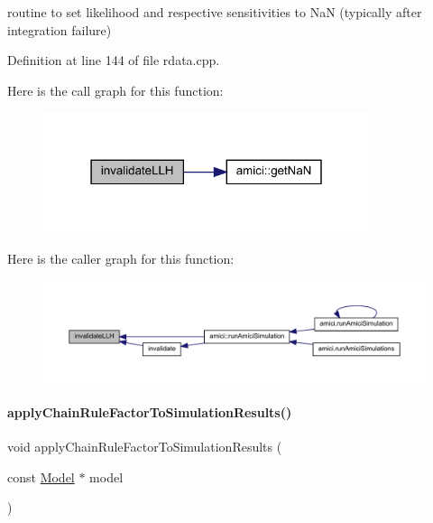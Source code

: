 routine to set likelihood and respective sensitivities to NaN (typically after integration failure)

Definition at line 144 of file rdata.\+cpp.

Here is the call graph for this function\+:
\nopagebreak
\begin{figure}[H]
\begin{center}
\leavevmode
\includegraphics[width=271pt]{classamici_1_1_return_data_a03e88745280c032d3b59fd7235665e17_cgraph}
\end{center}
\end{figure}
Here is the caller graph for this function\+:
\nopagebreak
\begin{figure}[H]
\begin{center}
\leavevmode
\includegraphics[width=350pt]{classamici_1_1_return_data_a03e88745280c032d3b59fd7235665e17_icgraph}
\end{center}
\end{figure}
\mbox{\label{classamici_1_1_return_data_adce202dc864a1e65d8453f597de271f5}} 
\paragraph{\texorpdfstring{apply\+Chain\+Rule\+Factor\+To\+Simulation\+Results()}{applyChainRuleFactorToSimulationResults()}}
{\footnotesize\ttfamily void apply\+Chain\+Rule\+Factor\+To\+Simulation\+Results (\begin{DoxyParamCaption}\item[{const \mbox{\hyperlink{classamici_1_1_model}{Model}} $\ast$}]{model }\end{DoxyParamCaption})}

